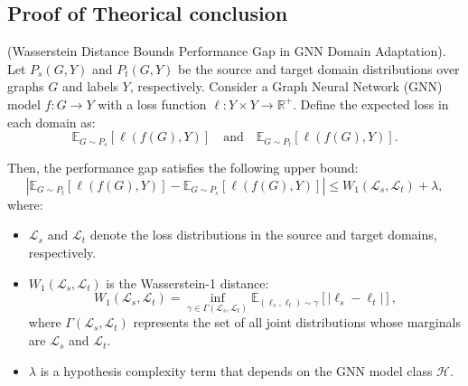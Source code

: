\subsection{Proof of Theorical conclusion}
\label{the:final}
\begin{lemma}
(Wasserstein Distance Bounds Performance Gap in GNN Domain Adaptation). Let $P_s(G, Y)$ and $P_t(G, Y)$ be the source and target domain distributions over graphs $G$ and labels $Y$, respectively. Consider a Graph Neural Network (GNN) model $f: G \to Y$ with a loss function $\ell: Y \times Y \to \mathbb{R}^+$. Define the expected loss in each domain as:
\begin{equation}
    \mathbb{E}_{G \sim P_s} [\ell(f(G), Y)] \quad \text{and} \quad \mathbb{E}_{G \sim P_t} [\ell(f(G), Y)].
\end{equation}

Then, the performance gap satisfies the following upper bound:
\begin{equation}
    \left| \mathbb{E}_{G \sim P_t} [\ell(f(G), Y)] - \mathbb{E}_{G \sim P_s} [\ell(f(G), Y)] \right| \leq W_1(\mathcal{L}_s, \mathcal{L}_t) + \lambda,
\end{equation}
where:
\begin{itemize}
    \item $\mathcal{L}_s$ and $\mathcal{L}_t$ denote the loss distributions in the source and target domains, respectively.
    \item $W_1(\mathcal{L}_s, \mathcal{L}_t)$ is the Wasserstein-1 distance:
    \begin{equation}
        W_1(\mathcal{L}_s, \mathcal{L}_t) = \inf_{\gamma \in \Gamma(\mathcal{L}_s, \mathcal{L}_t)} \mathbb{E}_{(\ell_s, \ell_t) \sim \gamma} [|\ell_s - \ell_t|],
    \end{equation}
    where $\Gamma(\mathcal{L}_s, \mathcal{L}_t)$ represents the set of all joint distributions whose marginals are $\mathcal{L}_s$ and $\mathcal{L}_t$.
    \item $\lambda$ is a hypothesis complexity term that depends on the GNN model class $\mathcal{H}$.
\end{itemize}
\end{lemma}

